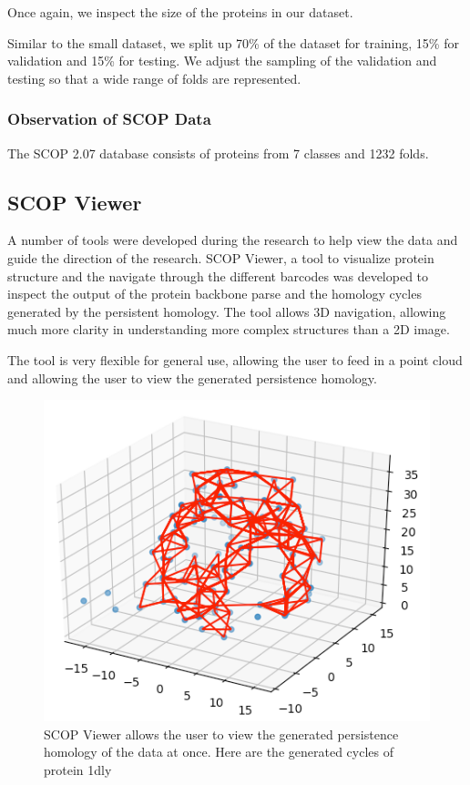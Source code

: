\documentclass[12pt, a4paper, twocolumn, fullpage]{article}
\theoremstyle{plain}
\theoremstyle{definition}
\theoremstyle{remark}
\begin{document}
Once again, we inspect the size of the proteins in our dataset.

Similar to the small dataset, we split up 70\% of the dataset for training, 15\% for validation and 15\% for testing. We adjust the sampling of the validation and testing so that a wide range of folds are represented.

\subsubsection{Observation of SCOP Data}

The SCOP 2.07 database consists of proteins from 7 classes and 1232 folds.

\subsection{SCOP Viewer}
A number of tools were developed during the research to help view the data and guide the direction of the research. SCOP Viewer, a tool to visualize protein structure and the navigate through the different barcodes was developed to inspect the output of the protein backbone parse and the homology cycles generated by the persistent homology. The tool allows 3D navigation, allowing much more clarity in understanding more complex structures than a 2D image.

The tool is very flexible for general use, allowing the user to feed in a point cloud and allowing the user to view the generated persistence homology. 

\begin{figure}
    \includegraphics[width=\linewidth]{img/scopviewer/scopviewer1}
    \caption{SCOP Viewer allows the user to view the generated persistence homology of the data at once. Here are the generated cycles of protein 1dly}
    \label{}
\end{figure}
\end{document}
